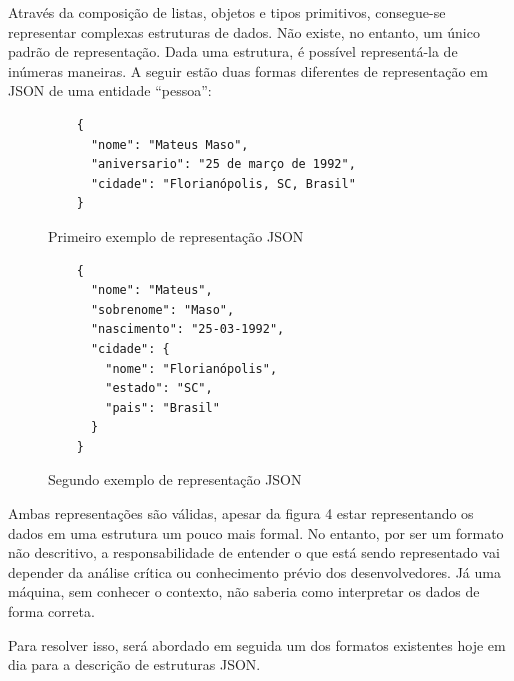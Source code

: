 Através da composição de listas, objetos e tipos primitivos, consegue-se representar complexas estruturas de dados. Não existe, no entanto, um único padrão de representação. Dada uma estrutura, é possível representá-la de inúmeras maneiras. A seguir estão duas formas diferentes de representação em JSON de uma entidade “pessoa”:
 \cite{Droettboom2015}

\begin{figure}[H]
  \centering
  \begin{verbatim}
    {
      "nome": "Mateus Maso",
      "aniversario": "25 de março de 1992",
      "cidade": "Florianópolis, SC, Brasil"
    }
  \end{verbatim}
  \caption{Primeiro exemplo de representação JSON}
\end{figure}

\begin{figure}[H]
  \centering
  \begin{verbatim}
    {
      "nome": "Mateus",
      "sobrenome": "Maso",
      "nascimento": "25-03-1992",
      "cidade": {
        "nome": "Florianópolis",
        "estado": "SC",
        "pais": "Brasil"
      }
    }
  \end{verbatim}
  \caption{Segundo exemplo de representação JSON}
\end{figure}

Ambas representações são válidas, apesar da figura 4 estar representando os dados em uma estrutura um pouco mais formal. No entanto, por ser um formato não descritivo, a responsabilidade de entender o que está sendo representado vai depender da análise crítica ou conhecimento prévio dos desenvolvedores. Já uma máquina, sem conhecer o contexto, não saberia como interpretar os dados de forma correta. \cite{Droettboom2015}

Para resolver isso, será abordado em seguida um dos formatos existentes hoje em dia para a descrição de estruturas JSON.


